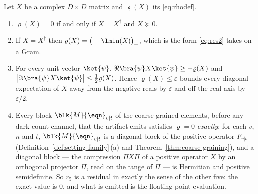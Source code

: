 
\begin{proposition}\label{prop:res5}
Let $X$ be a complex $D\times D$ matrix and $\varrho(X)$ its
 \eqref{eq:rhodef}.
\begin{enumerate}[label=(\roman*),leftmargin=3.0em]
\item $\varrho(X)=0$ if and only if $X=X^\dagger$ and $X\succeq0$.
\item If $X=X^\dagger$ then $\varrho(X)=\big(-\lmin(X)\big)_+$, which is the
  form \eqref{eq:res2} takes on a Gram.
\item For every unit vector $\ket{\psi}$,
  $\Re\bra{\psi}X\ket{\psi}\ge-\varrho(X)$ and
  $\big|\Im\bra{\psi}X\ket{\psi}\big|\le\tfrac12\varrho(X)$. Hence
  $\varrho(X)\le\varepsilon$ bounds every diagonal expectation of $X$ away from
  the negative reals by $\varepsilon$ and off the real axis by
  $\varepsilon/2$.
\item Every block $\blk{M}{\eqn}_{v|t}$ of the coarse-grained elements, before
  any dark-count channel, that the artifact emits satisfies $\varrho=0$
  \emph{exactly}: for
  each $v$, $n$ and $t$, $\blk{M}{\eqn}_{v|t}$ is a diagonal block of the
  positive operator $F_{v|t}$ (Definition~\ref{def:setting-family}\,(a) and
  Theorem~\ref{thm:coarse-graining}), and a diagonal block --- the compression $\Pi X\Pi$ of a positive
  operator $X$ by an orthogonal projector $\Pi$, read on the range of $\Pi$ ---
  is Hermitian and positive semidefinite. So $r_5$ is a residual in exactly the
  sense of the other five: the exact value is $0$, and what is emitted is the
  floating-point evaluation.
\end{enumerate}
\end{proposition}

